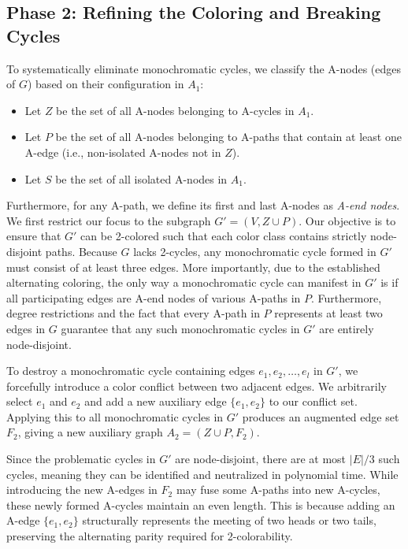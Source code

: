 \subsection{Phase 2: Refining the Coloring and Breaking Cycles}
To systematically eliminate monochromatic cycles, we classify the A-nodes (edges
of $G$) based on their configuration in $A_1$:
\begin{itemize}
    \item Let $Z$ be the set of all A-nodes belonging to A-cycles in $A_1$.
    \item Let $P$ be the set of all A-nodes belonging to A-paths that contain at
    least one A-edge (i.e., non-isolated A-nodes not in $Z$).
    \item Let $S$ be the set of all isolated A-nodes in $A_1$.
\end{itemize}
Furthermore, for any A-path, we define its first and last A-nodes as
\textit{A-end nodes}.
We first restrict our focus to the subgraph $G' = (V, Z \cup P)$. Our objective
is to ensure that $G'$ can be 2-colored such that each color class contains
strictly node-disjoint paths. Because $G$ lacks 2-cycles, any monochromatic
cycle formed in $G'$ must consist of at least three edges. More importantly, due
to the established alternating coloring, the only way a monochromatic cycle can
manifest in $G'$ is if all participating edges are A-end nodes of various
A-paths in $P$. Furthermore, degree restrictions and the fact that every A-path
in $P$ represents at least two edges in $G$ guarantee that any such
monochromatic cycles in $G'$ are entirely node-disjoint.

To destroy a monochromatic cycle containing edges $e_1, e_2, \dots, e_l$ in
$G'$, we forcefully introduce a color conflict between two adjacent edges. We
arbitrarily select $e_1$ and $e_2$ and add a new auxiliary edge $\{e_1, e_2\}$
to our conflict set. Applying this to all monochromatic cycles in $G'$ produces
an augmented edge set $F_2$, giving a new auxiliary graph $A_2 = (Z \cup P,
F_2)$.

Since the problematic cycles in $G'$ are node-disjoint, there are at most
$|E|/3$ such cycles, meaning they can be identified and neutralized in
polynomial time. While introducing the new A-edges in $F_2$ may fuse some
A-paths into new A-cycles, these newly formed A-cycles maintain an even length.
This is because adding an A-edge $\{e_1, e_2\}$ structurally represents the
meeting of two heads or two tails, preserving the alternating parity required
for 2-colorability.

